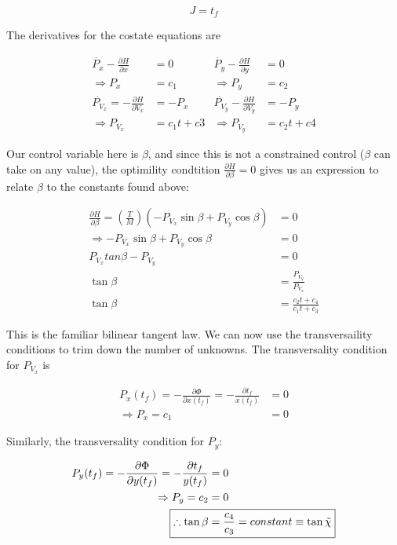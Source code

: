 \documentclass{article}
\begin{document}
\begin{equation*}
J = t_f
\end{equation*}

The derivatives for the costate equations are 

\begin{align*}
\dot{P_x}-\frac{\partial H}{\partial x} &= 0 & \dot{P_y}-\frac{\partial H}{\partial y} &= 0 \\
\Rightarrow P_x &= c_1 & \Rightarrow P_y &= c_2\\
\dot{P_{V_{x}}} = -\frac{\partial H}{\partial V_{x}} &= -P_{x}  & \dot{P_{V_{y}}}-\frac{\partial H}{\partial V_{y}} &= -P_{y} \\
\Rightarrow P_{V_{x}} &= c_1t +c3 & \Rightarrow P_{V_{y}} &= c_2t +c4
\end{align*}

Our control variable here is $\beta$, and since this is not a constrained control ($\beta$ can take on any value), the optimility condtition 
$\frac{\partial H}{\partial \beta} = 0$ gives us an expression to relate $\beta$ to the constants found above: 

\begin{align*}
\frac{\partial H}{\partial \beta} =  (\frac{T}{M}) (-P_{V_{x}} \sin\beta + P_{V_{y}}\cos\beta) &= 0 \\
\Rightarrow -P_{V_{x}} \sin\beta + P_{V_{y}}\cos\beta &= 0 \\
P_{V_{x}} tan\beta - P_{V_{y}} &= 0 \\
\tan\beta &= \frac{P_{V_{y}}}{P_{V_{x}}} \\ 
\tan\beta &= \frac{c_2 t + c_4}{c_1 t + c_3}																
\end{align*}

This is the familiar bilinear tangent law. We can now use the transversaility conditions to trim down the number of unknowns. The transversality
condition for $P_{V_{x}}$ is	

\begin{align*}
P_x (t_f) = -\frac{\partial \Phi }{\partial x(t_f)} = -\frac{\partial t_f }{x(t_f)} &= 0 \\
\Rightarrow P_x = c_1 &= 0 
\end{align*}

Similarly, the transversality condition for $P_y$: 

\begin{align*}
P_y (t_f) = -\frac{\partial \Phi }{\partial y(t_f)} = -\frac{\partial t_f }{y(t_f)} &= 0 \\
\Rightarrow P_y = c_2 &= 0 \\
\Aboxed{\therefore\tan\beta &= \frac{c_4}{c_3} = constant \equiv \tan\tilde{\chi}}
\end{align*}
\end{document}
